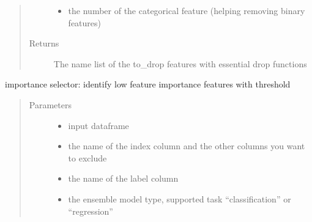 \documentclass[letterpaper,11pt,english]{sphinxmanual}
\begin{document}
\begin{fulllineitems}
\begin{fulllineitems}
\begin{quote}
\begin{description}
\begin{itemize}
\item {} 
 \textendash{} the number of the categorical feature (helping removing binary features)

\end{itemize}

\item[{Returns}] \leavevmode
The name list of the to\_drop features with essential  drop functions

\end{description}\end{quote}

\end{fulllineitems}


\begin{fulllineitems}
\label{\detokenize{auto_feature:AutoFeatures.AutoFeatures.importance_selector}}
importance selector: identify low feature importance features with threshold
\begin{quote}\begin{description}
\item[{Parameters}] \leavevmode\begin{itemize}
\item {} 
 \textendash{} input dataframe

\item {} 
 \textendash{} the name of the index column and the other columns you want to exclude

\item {} 
 \textendash{} the name of the label column

\item {} 
 \textendash{} the ensemble model type, supported task “classification” or “regression”


\end{itemize}
\end{description}
\end{quote}
\end{fulllineitems}
\end{fulllineitems}
\end{document}
